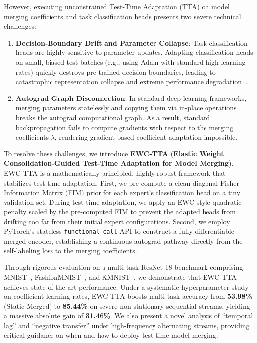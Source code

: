 \documentclass{article}
\theoremstyle{plain}
\theoremstyle{definition}
\theoremstyle{remark}
\begin{document}
However, executing unconstrained Test-Time Adaptation (TTA) on model merging coefficients and task classification heads presents two severe technical challenges:
\begin{enumerate}
    \item \textbf{Decision-Boundary Drift and Parameter Collapse}: Task classification heads are highly sensitive to parameter updates. Adapting classification heads on small, biased test batches (e.g., using Adam with standard high learning rates) quickly destroys pre-trained decision boundaries, leading to catastrophic representation collapse and extreme performance degradation~\citep{sata2026sata, symerge2026sbf}.
    \item \textbf{Autograd Graph Disconnection}: In standard deep learning frameworks, merging parameters statelessly and copying them via in-place operations breaks the autograd computational graph. As a result, standard backpropagation fails to compute gradients with respect to the merging coefficients $\lambda$, rendering gradient-based coefficient adaptation impossible.
\end{enumerate}

To resolve these challenges, we introduce \textbf{EWC-TTA} (\textbf{Elastic Weight Consolidation-Guided Test-Time Adaptation for Model Merging}). EWC-TTA is a mathematically principled, highly robust framework that stabilizes test-time adaptation. First, we pre-compute a clean diagonal Fisher Information Matrix (FIM) prior for each expert's classification head on a tiny validation set. During test-time adaptation, we apply an EWC-style quadratic penalty scaled by the pre-computed FIM to prevent the adapted heads from drifting too far from their initial expert configurations. Second, we employ PyTorch's stateless \texttt{functional\_call} API to construct a fully differentiable merged encoder, establishing a continuous autograd pathway directly from the self-labeling loss to the merging coefficients. 

Through rigorous evaluation on a multi-task ResNet-18 benchmark comprising MNIST~\citep{lecun1998gradient}, FashionMNIST~\citep{xiao2017fashion}, and KMNIST~\citep{clanuwat2018deep}, we demonstrate that EWC-TTA achieves state-of-the-art performance. Under a systematic hyperparameter study on coefficient learning rates, EWC-TTA boosts multi-task accuracy from \textbf{53.98\%} (Static Merged) to \textbf{85.44\%} on severe non-stationary sequential streams, yielding a massive absolute gain of \textbf{31.46\%}. We also present a novel analysis of ``temporal lag'' and ``negative transfer'' under high-frequency alternating streams, providing critical guidance on when and how to deploy test-time model merging.
\end{document}

